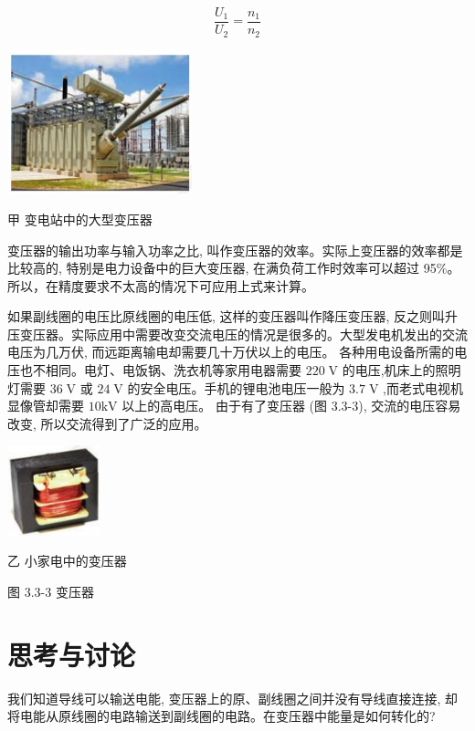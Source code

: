 \documentclass[10pt]{article}
\begin{document}
\[
\frac{{U}_{1}}{{U}_{2}} = \frac{{n}_{1}}{{n}_{2}}
\]

\begin{center}
\includegraphics[max width=0.4\textwidth]{images/01910e72-c5b7-7ed5-a6d4-fb3a5faefc32_65_832074.jpg}
\end{center}

甲 变电站中的大型变压器

变压器的输出功率与输入功率之比, 叫作变压器的效率。实际上变压器的效率都是比较高的, 特别是电力设备中的巨大变压器, 在满负荷工作时效率可以超过 95\%。所以，在精度要求不太高的情况下可应用上式来计算。

如果副线圈的电压比原线圈的电压低, 这样的变压器叫作降压变压器, 反之则叫升压变压器。实际应用中需要改变交流电压的情况是很多的。大型发电机发出的交流电压为几万伏, 而远距离输电却需要几十万伏以上的电压。 各种用电设备所需的电压也不相同。电灯、电饭锅、洗衣机等家用电器需要 \({220}\mathrm{\;V}\) 的电压,机床上的照明灯需要 \({36}\mathrm{\;V}\) 或 \({24}\mathrm{\;V}\) 的安全电压。手机的锂电池电压一般为 \({3.7}\mathrm{\;V}\) ,而老式电视机显像管却需要 \({10}\mathrm{{kV}}\) 以上的高电压。 由于有了变压器 (图 3.3-3), 交流的电压容易改变, 所以交流得到了广泛的应用。

\begin{center}
\includegraphics[max width=0.2\textwidth]{images/01910e72-c5b7-7ed5-a6d4-fb3a5faefc32_65_437874.jpg}
\end{center}

乙 小家电中的变压器

图 3.3-3 变压器

\section*{思考与讨论}

我们知道导线可以输送电能, 变压器上的原、副线圈之间并没有导线直接连接, 却将电能从原线圈的电路输送到副线圈的电路。在变压器中能量是如何转化的?
\end{document}
